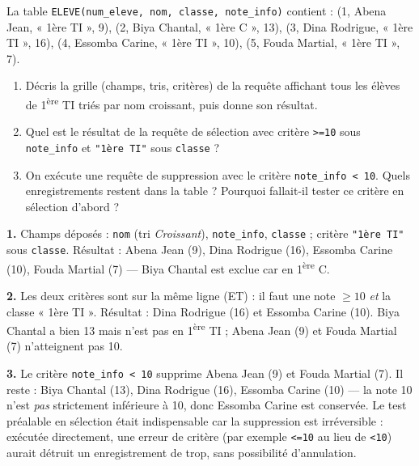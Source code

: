 \documentclass[11pt]{article}
\begin{document}
\begin{exercice}
La table \texttt{ELEVE(num\_eleve, nom, classe, note\_info)} contient : (1, Abena Jean, « 1ère TI », 9), (2, Biya Chantal, « 1ère C », 13), (3, Dina Rodrigue, « 1ère TI », 16), (4, Essomba Carine, « 1ère TI », 10), (5, Fouda Martial, « 1ère TI », 7).
\begin{enumerate}
\item Décris la grille (champs, tris, critères) de la requête affichant tous les élèves de 1\textsuperscript{ère} TI triés par nom croissant, puis donne son résultat.
\item Quel est le résultat de la requête de sélection avec critère \texttt{>=10} sous \texttt{note\_info} et \texttt{"1ère TI"} sous \texttt{classe} ?
\item On exécute une requête de suppression avec le critère \texttt{note\_info < 10}. Quels enregistrements restent dans la table ? Pourquoi fallait-il tester ce critère en sélection d'abord ?
\end{enumerate}
\end{exercice}

\begin{corrige}
\textbf{1.} Champs déposés : \texttt{nom} (tri \emph{Croissant}), \texttt{note\_info}, \texttt{classe} ; critère \texttt{"1ère TI"} sous \texttt{classe}. Résultat : Abena Jean (9), Dina Rodrigue (16), Essomba Carine (10), Fouda Martial (7) — Biya Chantal est exclue car en 1\textsuperscript{ère} C.\par
\textbf{2.} Les deux critères sont sur la même ligne (ET) : il faut une note $\geq 10$ \emph{et} la classe « 1ère TI ». Résultat : Dina Rodrigue (16) et Essomba Carine (10). Biya Chantal a bien 13 mais n'est pas en 1\textsuperscript{ère} TI ; Abena Jean (9) et Fouda Martial (7) n'atteignent pas 10.\par
\textbf{3.} Le critère \texttt{note\_info < 10} supprime Abena Jean (9) et Fouda Martial (7). Il reste : Biya Chantal (13), Dina Rodrigue (16), Essomba Carine (10) — la note 10 n'est \emph{pas} strictement inférieure à 10, donc Essomba Carine est conservée. Le test préalable en sélection était indispensable car la suppression est irréversible : exécutée directement, une erreur de critère (par exemple \texttt{<=10} au lieu de \texttt{<10}) aurait détruit un enregistrement de trop, sans possibilité d'annulation.
\end{corrige}

\newpage
\end{document}
